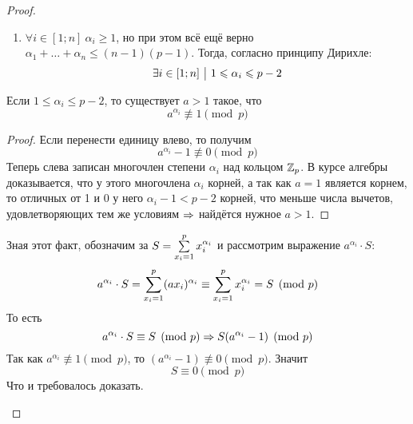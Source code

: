 \begin{proof}
\begin{enumerate}
\begin{enumerate}
			\item $\forall i \in [1; n]\ \alpha_i \ge 1$, но при этом всё ещё верно $\alpha_1 + \ldots + \alpha_n \le (n - 1)(p - 1)$. Тогда, согласно принципу Дирихле:
			\[
				\exists i \in [1; n] \ \big|\  1 \leqslant \alpha_i \leqslant p - 2
			\]
		\end{enumerate}
		\begin{proposition}
			Если $1 \le \alpha_i \le p - 2$, то существует $a > 1$ такое, что
			\[
				a^{\alpha_i} \not\equiv 1 \pmod p
			\]
		\end{proposition}
		\begin{proof}
			Если перенести единицу влево, то получим
			\[
				a^{\alpha_i} - 1 \not\equiv 0 \pmod p
			\]
			Теперь слева записан многочлен степени $\alpha_i$ над кольцом $\mathbb{Z}_p$. В курсе алгебры доказывается, что у этого многочлена $\alpha_i$ корней, а так как $a = 1$ является корнем, то отличных от 1 и 0 у него $\alpha_i - 1 < p - 2$ корней, что меньше числа вычетов, удовлетворяющих тем же условиям $\Rightarrow$ найдётся нужное $a > 1$.
		\end{proof}
		
		Зная этот факт, обозначим за $S = \sum\limits_{x_i = 1}^p x_i^{\alpha_i}$ и рассмотрим выражение $a^{\alpha_i} \cdot S$:
		\[
			a^{\alpha_i} \cdot S = \sum\limits_{x_i = 1}^p (ax_i)^{\alpha_i} \equiv \sum\limits_{x_i = 1}^p x_i^{\alpha_i} = S \pmod p
		\]
		То есть
		\[
			a^{\alpha_i} \cdot S \equiv S \pmod p \Rightarrow S(a^{\alpha_i} - 1) \pmod p
		\]
		Так как $a^{\alpha_i} \not\equiv 1 \pmod p$, то $(a^{\alpha_i} - 1) \not\equiv 0 \pmod p$. Значит
		\[
			S \equiv 0 \pmod p
		\]
		Что и требовалось доказать.
	\end{enumerate}
\end{proof}
